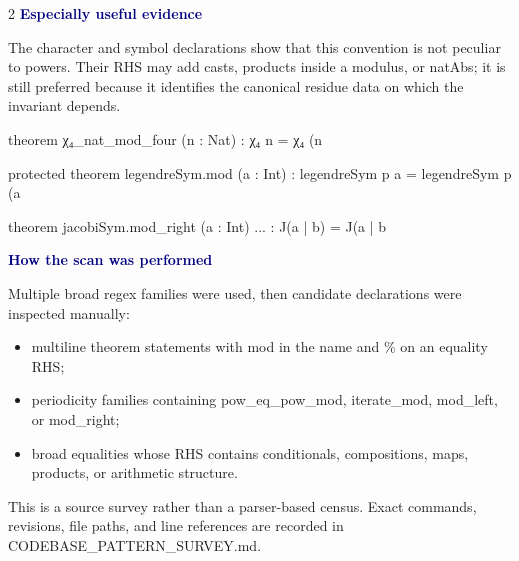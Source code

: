 \documentclass[10pt]{article}
\newenvironment{leansmall}{\Verbatim[fontsize=\scriptsize,frame=single,framesep=1.5mm,rulecolor=\color{blue!35},formatcom=\leanfont]}{\endVerbatim}
\newcommand{\code}[1]{{\leanfont #1}}
\newcommand{\decision}[1]{\textcolor{navy}{\bfseries #1}}
\begin{document}
\begin{center}
\end{center}

\begin{multicols}{2}
\decision{Especially useful evidence}

The character and symbol declarations show that this convention is not peculiar to powers.  Their RHS may add casts, products inside a modulus, or \code{natAbs}; it is still preferred because it identifies the canonical residue data on which the invariant depends.

\begin{leansmall}
theorem χ₄_nat_mod_four (n : Nat) :
  χ₄ n = χ₄ (n %

protected theorem legendreSym.mod (a : Int) :
  legendreSym p a = legendreSym p (a %

 theorem jacobiSym.mod_right (a : Int) ... :
  J(a | b) = J(a | b %
\end{leansmall}

\columnbreak
\decision{How the scan was performed}

Multiple broad regex families were used, then candidate declarations were inspected manually:
\begin{itemize}
\item multiline theorem statements with \code{mod} in the name and \code{\%} on an equality RHS;
\item periodicity families containing \code{pow\_eq\_pow\_mod}, \code{iterate\_mod}, \code{mod\_left}, or \code{mod\_right};
\item broad equalities whose RHS contains conditionals, compositions, maps, products, or arithmetic structure.
\end{itemize}

This is a source survey rather than a parser-based census.  Exact commands, revisions, file paths, and line references are recorded in \code{CODEBASE\_PATTERN\_SURVEY.md}.

\end{multicols}
\end{document}
